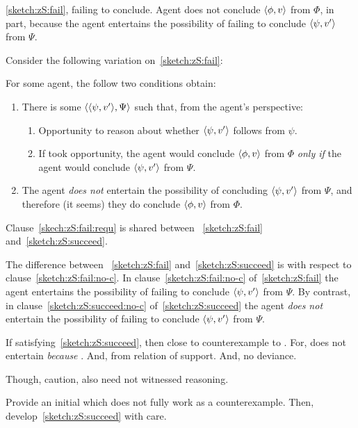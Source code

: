 \begin{note}
  \autoref{sketch:zS:fail}, failing to conclude.
  Agent does not conclude \(\langle \phi, v \rangle\) from \(\Phi\), in part, because the agent entertains the possibility of failing to conclude \(\langle \psi, v' \rangle\) from \(\Psi\).

  Consider the following variation on~\autoref{sketch:zS:fail}:
  \begin{sketch}
    \label{sketch:zS:succeed}
    For some agent, the follow two conditions obtain:
    \begin{enumerate}
    \item
      \label{sketch:zS:succeed:requ}
      There is some \(\langle \langle \psi, v' \rangle, \Psi \rangle\) such that, from the agent's perspective:
      \begin{enumerate}[label=\alph*., ref=(\alph*)]
      \item
        \label{sketch:zS:succeed:requ:opportunity}
        Opportunity to reason about whether \(\langle \psi, v' \rangle\) follows from \(\psi\).
      \item
        \label{sketch:zS:succeed:requ:conditional}
        If took opportunity, the agent would conclude \(\langle \phi, v \rangle\) from \(\Phi\) \emph{only if} the agent would conclude \(\langle \psi, v' \rangle\) from \(\Psi\).
      \end{enumerate}
    \item
      \label{sketch:zS:succeed:no-c}
       The agent \emph{does not} entertain the possibility of concluding \(\langle \psi, v' \rangle\) from \(\Psi\), and therefore (it seems) they do conclude \(\langle \phi, v \rangle\) from \(\Phi\).
    \end{enumerate}%
    \vspace{-\baselineskip}
  \end{sketch}

  Clause~\ref{skech:zS:fail:requ} is shared between ~\ref{sketch:zS:fail} and~\ref{sketch:zS:succeed}.

  The difference between ~\ref{sketch:zS:fail} and~\ref{sketch:zS:succeed} is with respect to clause~\ref{sketch:zS:fail:no-c}.
  In clause~\ref{sketch:zS:fail:no-c} of~\autoref{sketch:zS:fail} the agent entertains the possibility of failing to conclude \(\langle \psi, v' \rangle\) from \(\Psi\).
  By contrast, in clause~\ref{sketch:zS:succeed:no-c} of~\autoref{sketch:zS:succeed} the agent \emph{does not} entertain the possibility of failing to conclude \(\langle \psi, v' \rangle\) from \(\Psi\).
\end{note}

\begin{note}
  If  satisfying~\autoref{sketch:zS:succeed}, then close to counterexample to \issueConstraint{}.
  For, does not entertain \emph{because} \fc{}.
  And, from  \fc{} relation of support.
  And, no deviance.

  Though, caution, also need not witnessed reasoning.

  Provide an initial \scen{} which does not fully work as a counterexample.
  Then, develop~\autoref{sketch:zS:succeed} with care.
\end{note}

